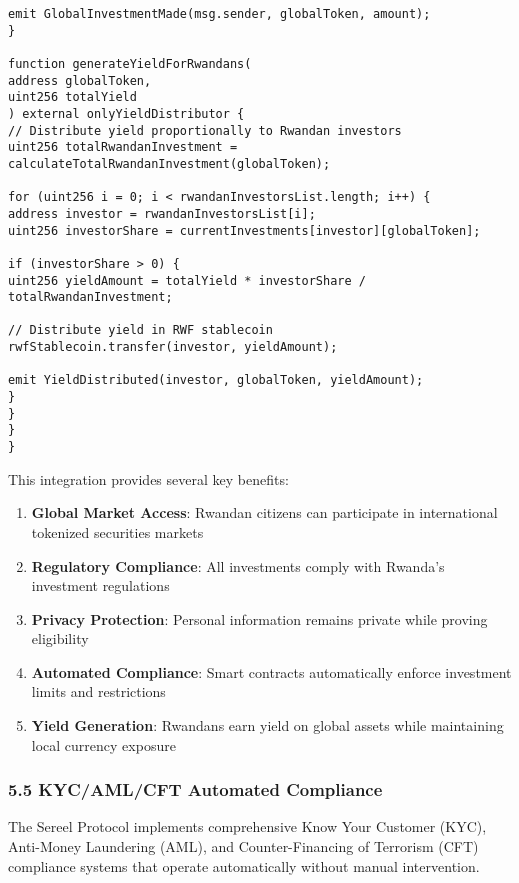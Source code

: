 \documentclass[12pt]{article}
\begin{document}
{{{\begin{lstlisting}
emit GlobalInvestmentMade(msg.sender, globalToken, amount);
}

function generateYieldForRwandans(
address globalToken,
uint256 totalYield
) external onlyYieldDistributor {
// Distribute yield proportionally to Rwandan investors
uint256 totalRwandanInvestment = calculateTotalRwandanInvestment(globalToken);

for (uint256 i = 0; i < rwandanInvestorsList.length; i++) {
address investor = rwandanInvestorsList[i];
uint256 investorShare = currentInvestments[investor][globalToken];

if (investorShare > 0) {
uint256 yieldAmount = totalYield * investorShare / totalRwandanInvestment;

// Distribute yield in RWF stablecoin
rwfStablecoin.transfer(investor, yieldAmount);

emit YieldDistributed(investor, globalToken, yieldAmount);
}
}
}
}
\end{lstlisting}


This integration provides several key benefits:

\begin{enumerate}
	\item \textbf{Global Market Access}: Rwandan citizens can participate in international tokenized securities markets
	\item \textbf{Regulatory Compliance}: All investments comply with Rwanda's investment regulations
	\item \textbf{Privacy Protection}: Personal information remains private while proving eligibility
	\item \textbf{Automated Compliance}: Smart contracts automatically enforce investment limits and restrictions
	\item \textbf{Yield Generation}: Rwandans earn yield on global assets while maintaining local currency exposure

\end{enumerate}
\subsubsection{5.5 KYC/AML/CFT Automated Compliance} %

The Sereel Protocol implements comprehensive Know Your Customer (KYC), Anti-Money Laundering (AML), and Counter-Financing of Terrorism (CFT) compliance systems that operate automatically without manual intervention.

}}}
\end{document}
